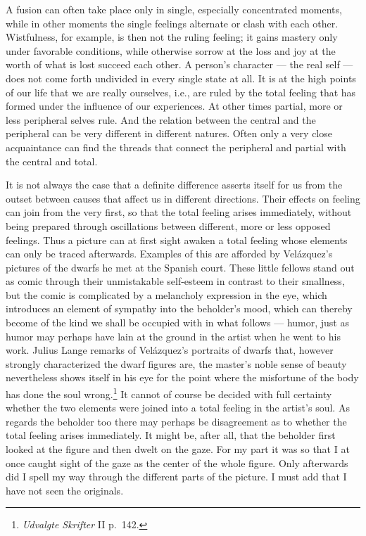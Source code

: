 \documentclass[12pt]{book}
\newcommand{\opage}[1]{\marginnote{\footnotesize\textit{[#1]}}}
\begin{document}
A fusion can often take place only in single, especially concentrated moments,
while in other moments the single feelings alternate or clash with each other.
Wistfulness, for example, is then not the ruling feeling; it gains mastery only
under favorable conditions, while otherwise sorrow at the loss and joy at the
worth of what is lost succeed each other. A person's character --- the real self
--- does not come forth undivided in every single state at all. It is at the high
points of our life that we are really ourselves, i.e., are ruled by the total
feeling that has formed under the influence of our experiences. At other times
partial, more or less peripheral selves rule. And the relation between the
central and the peripheral can be very different in different natures. Often only
a very close acquaintance can find the threads that connect the peripheral and
partial with the central and total.

It is not always the case that a definite difference asserts itself for us from
the outset between causes that affect us in different directions. Their effects
on feeling can join from the very first, so that the total feeling arises
immediately, without being prepared through oscillations between different, more
or less opposed feelings. Thus a picture can at first sight awaken a total feeling
whose elements can only be traced afterwards. Examples of this are afforded by
Velázquez's pictures of the dwarfs he met at the Spanish court. These little
fellows stand out as comic through their unmistakable self-esteem in contrast to
their smallness, but the comic is complicated by a melancholy expression in the
eye, which introduces an element of sympathy into the beholder's mood, which can
thereby become of the kind we shall be occupied with in what follows --- humor,
just as humor may perhaps have lain at the ground in the artist when he went to
his work. Julius Lange remarks of Velázquez's portraits of dwarfs that, however
strongly characterized the dwarf figures are, the master's noble sense of beauty
nevertheless shows itself in his \opage{28}eye for the point where the misfortune
of the body has done the soul wrong.\footnote{\textit{Udvalgte Skrifter} II
p.~142.} It cannot of course be decided with full certainty whether the two
elements were joined into a total feeling in the artist's soul. As regards the
beholder too there may perhaps be disagreement as to whether the total feeling
arises immediately. It might be, after all, that the beholder first looked at the
figure and then dwelt on the gaze. For my part it was so that I at once caught
sight of the gaze as the center of the whole figure. Only afterwards did I spell
my way through the different parts of the picture. I must add that I have not
seen the originals.
\end{document}
